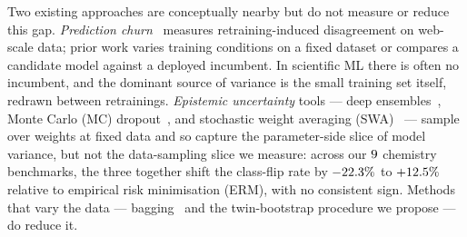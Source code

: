 Two existing approaches are conceptually nearby but do not measure
or reduce this gap.  \emph{Prediction churn}~\citep{launch_and_iterate,
bhojanapalli2021reproducibility, jiang2022} measures
retraining-induced disagreement on web-scale data; prior work varies
training conditions on a fixed dataset or compares a candidate model
against a deployed incumbent.  In scientific ML there is often no
incumbent, and the dominant source of variance is the small training
set itself, redrawn between retrainings.  \emph{Epistemic uncertainty} tools --- deep
ensembles~\citep{lakshminarayanan2017simple}, Monte Carlo (MC)
dropout~\citep{gal2015dropout}, and stochastic weight averaging
(SWA)~\citep{izmailov2018averaging} --- sample over weights at fixed
data and so capture the parameter-side slice of model variance, but
not the data-sampling slice we measure: across our
$9$ chemistry benchmarks, the three together shift
the class-flip rate by $-22.3\%$ to $+12.5\%$
relative to empirical risk minimisation (ERM), with no consistent
sign.  Methods that vary the data --- bagging~\citep{Breiman1996} and
the twin-bootstrap procedure we propose --- do reduce it.

